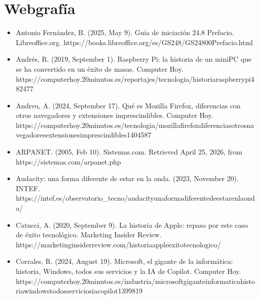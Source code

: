 \documentclass[letterpaper,10pt,spanish]{sphinxmanual}
\begin{document}
\chapter{Webgrafía}
\label{\detokenize{2_referencias/webgrafia:webgrafia}}\label{\detokenize{2_referencias/webgrafia::doc}}\begin{itemize}
\item {} 
\sphinxAtStartPar
Antonio Fernández, B. (2025, May 9). Guía de iniciación 24.8 \sphinxhyphen{} Prefacio. Libreoffice.org. https://books.libreoffice.org/es/GS248/GS24800\sphinxhyphen{}Prefacio.html

\item {} 
\sphinxAtStartPar
Andrés, R. (2019, September 1). Raspberry Pi: la historia de un mini\sphinxhyphen{}PC que se ha convertido en un éxito de masas. Computer Hoy. https://computerhoy.20minutos.es/reportajes/tecnologia/historia\sphinxhyphen{}raspberry\sphinxhyphen{}pi\sphinxhyphen{}482477

\item {} 
\sphinxAtStartPar
Andreu, A. (2024, September 17). Qué es Mozilla Firefox, diferencias con otros navegadores y extensiones imprescindibles. Computer Hoy. https://computerhoy.20minutos.es/tecnologia/mozilla\sphinxhyphen{}firefox\sphinxhyphen{}diferencias\sphinxhyphen{}otros\sphinxhyphen{}navegadores\sphinxhyphen{}extensiones\sphinxhyphen{}imprescindibles\sphinxhyphen{}1404587

\item {} 
\sphinxAtStartPar
ARPANET. (2005, Feb 10). Sistemas.com. Retrieved April 25, 2026, from https://sistemas.com/arpanet.php

\item {} 
\sphinxAtStartPar
Audacity: una forma diferente de estar en la onda. (2023, November 20). INTEF. https://intef.es/observatorio\_tecno/audacity\sphinxhyphen{}una\sphinxhyphen{}forma\sphinxhyphen{}diferente\sphinxhyphen{}de\sphinxhyphen{}estar\sphinxhyphen{}en\sphinxhyphen{}la\sphinxhyphen{}onda/

\item {} 
\sphinxAtStartPar
Catucci, A. (2020, September 9). La historia de Apple: repaso por este caso de éxito tecnológico. Marketing Insider Review. https://marketinginsiderreview.com/historia\sphinxhyphen{}apple\sphinxhyphen{}exito\sphinxhyphen{}tecnologico/

\item {} 
\sphinxAtStartPar
Corrales, R. (2024, August 19). Microsoft, el gigante de la informática: historia, Windows, todos sus servicios y la IA de Copilot. Computer Hoy. https://computerhoy.20minutos.es/industria/microsoft\sphinxhyphen{}gigante\sphinxhyphen{}informatica\sphinxhyphen{}historia\sphinxhyphen{}windows\sphinxhyphen{}todos\sphinxhyphen{}servicios\sphinxhyphen{}ia\sphinxhyphen{}copilot\sphinxhyphen{}1399819


\end{itemize}
\end{document}

